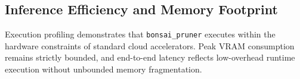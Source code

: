 \subsection{Inference Efficiency and Memory Footprint}
Execution profiling demonstrates that \texttt{bonsai\_pruner} executes within the hardware constraints of standard cloud accelerators. Peak VRAM consumption remains strictly bounded, and end-to-end latency reflects low-overhead runtime execution without unbounded memory fragmentation.
